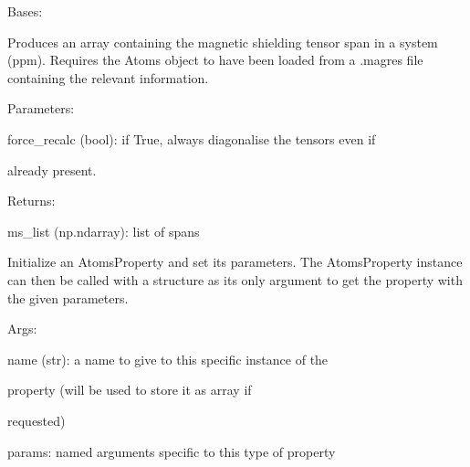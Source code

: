 \documentclass[letterpaper,10pt,english]{sphinxmanual}
\begin{document}
\begin{fulllineitems}
\label{doctree/soprano.properties.nmr.ms:soprano.properties.nmr.ms.MSSpan}
Bases: {\hyperref[doctree/soprano.properties.atomsproperty:soprano.properties.atomsproperty.AtomsProperty]{}}

Produces an array containing the magnetic shielding tensor span
in a system (ppm).
Requires the Atoms object to have been loaded from a .magres file
containing the relevant information.

\begin{DUlineblock}{0em}
\item[] Parameters:
\item[]
\begin{DUlineblock}{\DUlineblockindent}
\item[] force\_recalc (bool): if True, always diagonalise the tensors even if
\item[]
\begin{DUlineblock}{\DUlineblockindent}
\item[] already present.
\end{DUlineblock}
\end{DUlineblock}
\end{DUlineblock}

\begin{DUlineblock}{0em}
\item[] Returns:
\item[]
\begin{DUlineblock}{\DUlineblockindent}
\item[] ms\_list (np.ndarray): list of spans
\end{DUlineblock}
\end{DUlineblock}

Initialize an AtomsProperty and set its parameters.
The AtomsProperty instance can then be called with a structure as its
only argument to get the property with the given parameters.

\begin{DUlineblock}{0em}
\item[] Args:
\item[]
\begin{DUlineblock}{\DUlineblockindent}
\item[] name (str): a name to give to this specific instance of the
\item[]
\begin{DUlineblock}{\DUlineblockindent}
\item[] property (will be used to store it as array if
\item[] requested)
\end{DUlineblock}
\item[] params: named arguments specific to this type of property
\end{DUlineblock}
\end{DUlineblock}


\end{fulllineitems}
\end{document}
